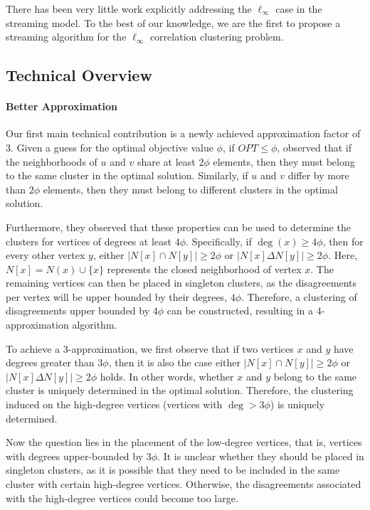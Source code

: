 There has been very little work explicitly addressing the $\ell_{\infty}$ case in the streaming model. To the best of our knowledge, we are the first to propose a streaming algorithm for the $\ell_{\infty}$ correlation clustering problem.



\subsection{Technical Overview} 
\paragraph{Better Approximation} Our first main technical contribution is a newly achieved approximation factor of 3. Given a guess for the optimal objective value $\phi$, if $OPT \leq \phi$, \cite{heidrich20244} observed that if the neighborhoods of $u$ and $v$ share at least $2\phi$ elements, then they must belong to the same cluster in the optimal solution. Similarly, if $u$ and $v$ differ by more than $2\phi$ elements, then they must belong to different clusters in the optimal solution. 

Furthermore, they observed that these properties can be used to determine the clusters for vertices of degrees at least $4\phi$. Specifically, if $\deg(x) \geq 4\phi$, then for every other vertex $y$, either $|N[x] \cap N[y]| \geq 2\phi$ or $|N[x] \Delta N[y]| \geq 2\phi$. Here, $N[x] = N(x) \cup \{x\}$ represents the closed neighborhood of vertex $x$. The remaining vertices can then be placed in singleton clusters, as the disagreements per vertex will be upper bounded by their degrees, $4\phi$. Therefore, a clustering of disagreements upper bounded by $4\phi$ can be constructed, resulting in a 4-approximation algorithm. 

To achieve a 3-approximation, we first observe that if two vertices $x$ and $y$ have degrees greater than $3\phi$, then it is also the case either $|N[x] \cap N[y]| \geq 2\phi$ or $|N[x] \Delta N[y]| \geq 2\phi$ holds. In other words, whether $x$ and $y$ belong to the same cluster is uniquely determined in the optimal solution. Therefore, the clustering induced on the high-degree vertices (vertices with $\deg > 3\phi$) is uniquely determined.

Now the question lies in the placement of the low-degree vertices, that is, vertices with degrees upper-bounded by $3\phi$. It is unclear whether they should be placed in singleton clusters, as it is possible that they need to be included in the same cluster with certain high-degree vertices. Otherwise, the disagreements associated with the high-degree vertices could become too large.

